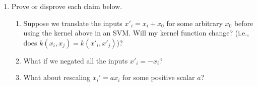 \begin{enumerate}
\begin{enumerate}
  \item {}  Prove or disprove each claim below.
  
    \begin{enumerate}
    \item Suppose we translate the inputs $x'_i = x_i + x_0$ for some
      arbitrary $x_0$ before using the kernel above in an SVM.  Will my
      kernel function change? (i.e., does $k(x_i,x_j) = k(x'_i,x'_j)$)?
    \item What if we negated all the inputs $x'_i = -x_i$?
    \item What about rescaling $x_i' = ax_i$ for some positive scalar $a$?
      
      
    \end{enumerate}  
  \end{enumerate}
\end{enumerate}
  
\PointStats
